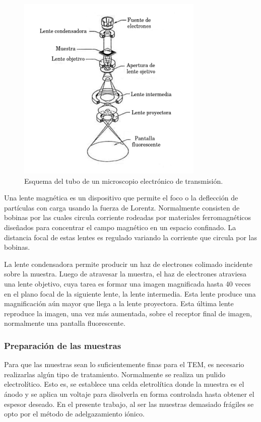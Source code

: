 \documentclass[12pt]{article}
\theoremstyle{definition}
\theoremstyle{remark}
\begin{document}
 \begin{figure}[H]
 	\centering
	\includegraphics[scale=0.5]{img/TEM.png}
 	\caption{Esquema del tubo de un microscopio electrónico de transmisión.}
	\label{TEM}
\end{figure} 

Una lente magnética es un dispositivo que permite el foco o la deflección de partículas con carga usando la fuerza de Lorentz. Normalmente consisten de bobinas por las cuales circula corriente rodeadas por materiales ferromagnéticos diseñados para concentrar el campo magnético en un espacio confinado. La distancia focal de estas lentes es regulado variando la corriente que circula por las bobinas.

La lente condensadora permite producir un haz de electrones colimado incidente sobre la muestra. Luego de atravesar la muestra, el haz de electrones atraviesa una lente objetivo, cuya tarea es formar una imagen magnificada hasta 40 veces en el plano focal de la siguiente lente, la lente intermedia. Esta lente produce una magnificación aún mayor que llega a la lente proyectora. Esta última lente reproduce la imagen, una vez más aumentada, sobre el receptor final de imagen, normalmente una pantalla fluorescente.

\subsubsection{Preparación de las muestras}

Para que las muestras sean lo suficientemente finas para el TEM, es necesario realizarlas algún tipo de tratamiento. Normalmente se realiza un pulido electrolítico. Esto es, se establece una celda eletrolítica donde la muestra es el ánodo y se aplica un voltaje para disolverla en forma controlada hasta obtener el espesor deseado. En el presente trabajo, al ser las muestras demasiado frágiles se opto por el método de adelgazamiento iónico. 
\end{document}
